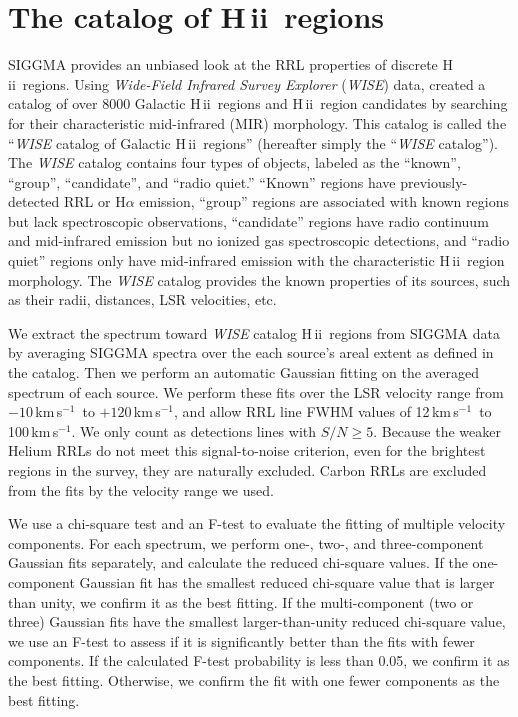 \documentclass[manuscript]{aastex61}
\newcommand{\hii}{{\rm H\,}{{\sc ii}}}
\newcommand{\kms}{\,km\,s$^{-1}$}
\begin{document}
\section{The catalog of \hii\ regions} \label{sec_cata}

SIGGMA provides an unbiased look at the RRL properties of discrete \hii\ regions.
Using {\it Wide-Field Infrared Survey Explorer} ({\it WISE}) data, \citet{Anderson2014} created a catalog of over 8000 Galactic \hii\ regions and \hii\ region candidates by searching for their characteristic mid-infrared (MIR) morphology.  This catalog is called the ``{\it WISE} catalog of Galactic \hii\ regions'' (hereafter simply the ``{\it WISE} catalog'').
The {\it WISE} catalog contains four types of objects, labeled as the ``known'', ``group'', ``candidate'', and ``radio quiet.''
``Known'' regions have previously-detected RRL or H$\alpha$ emission, ``group'' regions are associated with known regions but lack spectroscopic observations, ``candidate'' regions have radio continuum and mid-infrared emission but no ionized gas spectroscopic detections, and ``radio quiet'' regions only have mid-infrared emission with the characteristic \hii\ region morphology.
The {\it WISE} catalog provides the known properties of its sources, such as their radii, distances, LSR velocities, etc.

We extract the spectrum toward {\it WISE} catalog \hii\ regions from SIGGMA data by averaging SIGGMA spectra over the each source's areal extent as defined in the catalog.
Then we perform an automatic Gaussian fitting on the averaged spectrum of each source. 
We perform these fits over the LSR velocity range from $-10$\kms\ to $+120$\kms, and allow RRL line FWHM values of 12\kms\ to 100\kms. We only count as detections lines with $S/N \geq 5$.  Because the weaker Helium RRLs do not meet this signal-to-noise criterion, even for the brightest regions in the survey, they are naturally excluded.  Carbon RRLs are excluded from the fits by the velocity range we used.

We use a chi-square test and an F-test to evaluate the fitting of multiple velocity components.
For each spectrum, we perform one-, two-, and three-component Gaussian fits separately, and calculate the reduced chi-square values.
If the one-component Gaussian fit has the smallest reduced chi-square value that is larger than unity, we confirm it as the best fitting.
If the multi-component (two or three) Gaussian fits have the smallest larger-than-unity reduced chi-square value, we use an F-test to assess if it is significantly better than the fits with fewer components.
If the calculated F-test probability is less than 0.05, we confirm it as the best fitting.
Otherwise, we confirm the fit with one fewer components as the best fitting.
\end{document}
